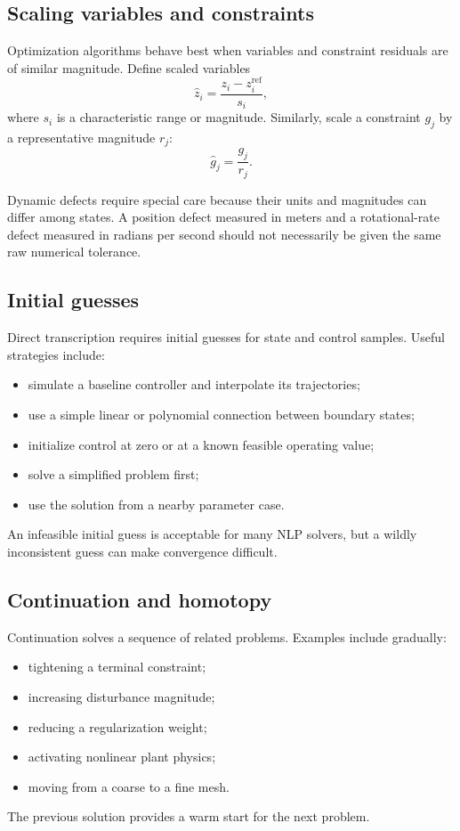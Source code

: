 \documentclass[11pt]{article}
\begin{document}
\subsection{Scaling variables and constraints}

Optimization algorithms behave best when variables and constraint residuals are of similar magnitude. Define scaled variables
\begin{equation}
\widehat{z}_i=\frac{z_i-z_i^{\mathrm{ref}}}{s_i},
\end{equation}
where $s_i$ is a characteristic range or magnitude. Similarly, scale a constraint $g_j$ by a representative magnitude $r_j$:
\begin{equation}
\widehat{g}_j=\frac{g_j}{r_j}.
\end{equation}

Dynamic defects require special care because their units and magnitudes can differ among states. A position defect measured in meters and a rotational-rate defect measured in radians per second should not necessarily be given the same raw numerical tolerance.

\subsection{Initial guesses}

Direct transcription requires initial guesses for state and control samples. Useful strategies include:
\begin{itemize}[leftmargin=1.4em]
  \item simulate a baseline controller and interpolate its trajectories;
  \item use a simple linear or polynomial connection between boundary states;
  \item initialize control at zero or at a known feasible operating value;
  \item solve a simplified problem first;
  \item use the solution from a nearby parameter case.
\end{itemize}

An infeasible initial guess is acceptable for many NLP solvers, but a wildly inconsistent guess can make convergence difficult.

\subsection{Continuation and homotopy}

Continuation solves a sequence of related problems. Examples include gradually:
\begin{itemize}[leftmargin=1.4em]
  \item tightening a terminal constraint;
  \item increasing disturbance magnitude;
  \item reducing a regularization weight;
  \item activating nonlinear plant physics;
  \item moving from a coarse to a fine mesh.
\end{itemize}
The previous solution provides a warm start for the next problem.
\end{document}
